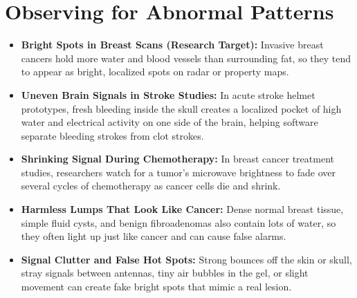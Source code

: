 \section{Observing for Abnormal Patterns}
\begin{itemize}
  \item \textbf{Bright Spots in Breast Scans (Research Target):} Invasive breast cancers hold more water and blood vessels than surrounding fat, so they tend to appear as bright, localized spots on radar or property maps.
  \item \textbf{Uneven Brain Signals in Stroke Studies:} In acute stroke helmet prototypes, fresh bleeding inside the skull creates a localized pocket of high water and electrical activity on one side of the brain, helping software separate bleeding strokes from clot strokes.
  \item \textbf{Shrinking Signal During Chemotherapy:} In breast cancer treatment studies, researchers watch for a tumor's microwave brightness to fade over several cycles of chemotherapy as cancer cells die and shrink.
  \item \textbf{Harmless Lumps That Look Like Cancer:} Dense normal breast tissue, simple fluid cysts, and benign fibroadenomas also contain lots of water, so they often light up just like cancer and can cause false alarms.
  \item \textbf{Signal Clutter and False Hot Spots:} Strong bounces off the skin or skull, stray signals between antennas, tiny air bubbles in the gel, or slight movement can create fake bright spots that mimic a real lesion.
\end{itemize}

